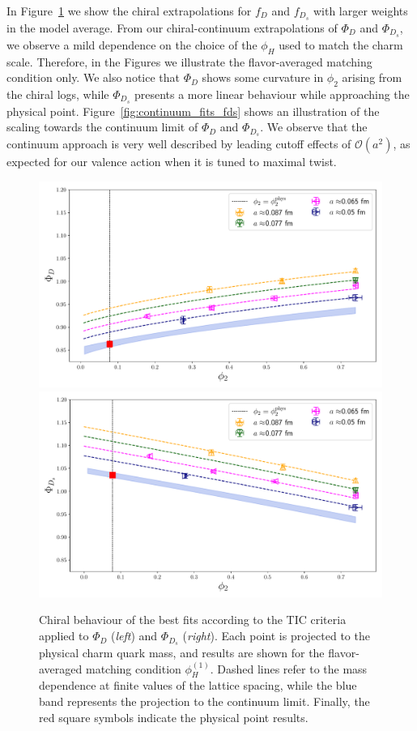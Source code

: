 In Figure~\ref{fig:chiral_fits_fds} we show the chiral extrapolations for $f_D$ and $f_{D_s}$
with larger weights in the model average.  From our chiral-continuum extrapolations of $\Phi_D$ and $\Phi_{D_s}$, we observe a mild 
dependence on the  choice of the $\phi_H$ used to match the charm scale. Therefore, in the Figures we 
illustrate the flavor-averaged matching condition only. We also notice that $\Phi_D$ shows some 
curvature in $\phi_2$ arising from the chiral logs, while $\Phi_{D_s}$ presents a more linear behaviour 
while approaching the physical point. Figure~\ref{fig:continuum_fits_fds} shows an illustration
of the scaling towards the continuum limit of $\Phi_D$ and $\Phi_{D_{s}}$. We observe that the continuum 
approach is very well described by leading cutoff effects of $\mathcal{O}(a^2)$, as expected for our valence action when it is tuned to maximal twist.
%
\begin{figure}
	\centering
	\includegraphics[scale=0.23]{./cap6/figs/fds/fit_fD_fl_ave.pdf}
	\includegraphics[scale=0.23]{./cap6/figs/fds/fit_fDs_fl_ave.pdf}
	\caption{Chiral behaviour of the best fits according to the TIC criteria applied to  $\Phi_D$ (\textit{left}) and $\Phi_{D_s}$ (\textit{right}). Each point is projected to the physical charm quark mass, and results are shown for the flavor-averaged matching condition $\phi_H^{(1)}$. Dashed lines refer to the mass dependence at finite  values of the lattice spacing, while the blue band represents the projection to the continuum limit. Finally, the red square symbols indicate the physical point results.}
	\label{fig:chiral_fits_fds}
\end{figure}

